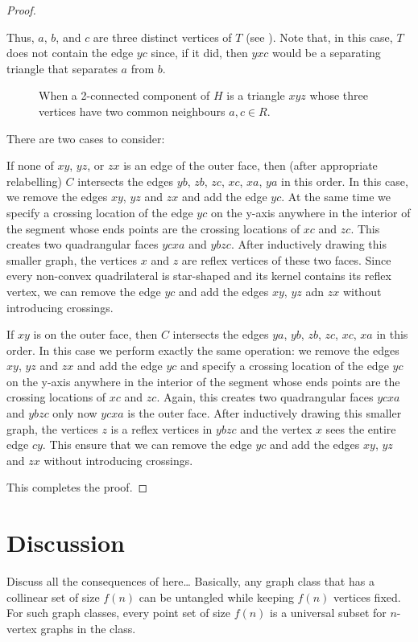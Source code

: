 \documentclass{patmorin}
\begin{document}
\begin{proof}
\begin{enumerate}
        Thus, $a$, $b$, and $c$ are three distinct vertices of $T$
        (see ). Note that, in this case, $T$ does not
        contain the edge $yc$ since, if it did, then $yxc$ would be
        a separating triangle that separates $a$ from $b$.
        \begin{figure}
           \caption{When a 2-connected component of $H$ is a triangle $xyz$ whose three vertices have two common neighbours $a,c\in R$.}
        \end{figure}
 
        There are two cases to consider: 

        If none of $xy$, $yz$, or $zx$ is an edge of the outer face,
        then (after appropriate relabelling) $C$ intersects the edges
        $yb$, $zb$, $zc$, $xc$, $xa$, $ya$ in this order.  In this case,
        we remove the edges $xy$, $yz$ and $zx$ and add the edge $yc$.
        At the same time we specify a crossing location of the edge
        $yc$ on the y-axis anywhere in the interior of the segment
        whose ends points are the crossing locations of $xc$ and $zc$.
        This creates two quadrangular faces $ycxa$ and $ybzc$.  After
        inductively drawing this smaller graph, the vertices $x$ and $z$
        are reflex vertices of these two faces.  Since every non-convex
        quadrilateral is star-shaped and its kernel contains its reflex
        vertex, we can remove the edge $yc$ and add the edges $xy$, $yz$
        adn $zx$ without introducing crossings.

        If $xy$ is on the outer face, then $C$ intersects the edges
        $ya$, $yb$, $zb$, $zc$, $xc$, $xa$ in this order. In this
        case we perform exactly the same operation:  we remove the
        edges $xy$, $yz$ and $zx$ and add the edge $yc$ and specify a
        crossing location of the edge $yc$ on the y-axis anywhere in
        the interior of the segment whose ends points are the crossing
        locations of $xc$ and $zc$.  Again, this creates two quadrangular
        faces $ycxa$ and $ybzc$ only now $ycxa$ is the outer face.
        After inductively drawing this smaller graph, the vertices $z$
        is a reflex vertices in $ybzc$ and the vertex $x$ sees the entire
        edge $cy$.  This ensure that we can remove the edge $yc$ and
        add the edges $xy$, $yz$ and $zx$ without introducing crossings.
   \end{enumerate}
   This completes the proof.
\end{proof}



\section{Discussion}

Discuss all the consequences of  here\ldots
Basically, any graph class that has a collinear set of size $f(n)$ can 
be untangled while keeping $f(n)$ vertices fixed.  For such graph classes,
every point set of size $f(n)$ is a universal subset for $n$-vertex graphs
in the class.
\end{document}
